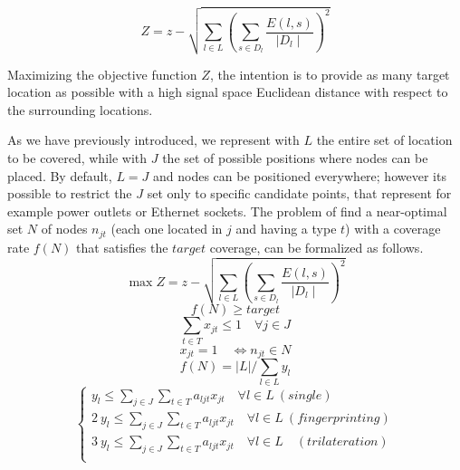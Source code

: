 \begin{equation}\label{eq:Z1}
Z = z - \sqrt{\sum\limits_{l\in L}\left(\sum\limits_{s\in D_l}\frac{E(l,s)}{\mid D_l \mid}\right)^2}
\end{equation}

Maximizing the objective function $Z$, the intention is to provide as many target location as possible with a high signal space Euclidean distance with respect to the surrounding locations.


As we have previously introduced, we represent with \(L\)  the entire set of location to be covered, while with \(J\) the set of possible positions where nodes can be placed. By default, \(L = J\) and nodes can be positioned everywhere; however its possible to restrict the \(J\) set only to specific candidate points, that represent for example power outlets or Ethernet sockets.
The problem of find a near-optimal set \(N\) of nodes \(n_{jt}\) (each one located in $j$ and having a type $t$) with a coverage rate $f(N)$ that satisfies the $target$ coverage, can be formalized as follows.
\begin{equation}\label{eq:Z}
\max Z = z - \sqrt{\sum\limits_{l\in L}\left(\sum\limits_{s\in D_l}\frac{E(l,s)}{\mid D_l \mid}\right)^2}
\end{equation}
\begin{equation}\label{eq:cov}
f(N) \geq target
\end{equation}
\begin{equation}\label{eq:one}
\sum\limits_{t \in T} x_{jt} \leq 1 \quad \forall j \in J
\end{equation}
\begin{equation}\label{eq:x}
x_{jt} = 1 \quad \iff n_{jt} \in N
\end{equation}
\begin{equation}\label{eq:f}
f(N)= \lvert L \rvert / \sum\limits_{l \in L} y_l
\end{equation}
\begin{equation}\label{eq:y}
\begin{cases}
y_l \leq \sum\limits_{j \in J}\sum\limits_{t \in T} a_{ljt} x_{jt} \quad \forall l \in L ~ (single)\\
2~y_l \leq \sum\limits_{j \in J}\sum\limits_{t \in T} a_{ljt} x_{jt} \quad \forall l \in L ~ (fingerprinting)\\
3~y_l \leq \sum\limits_{j \in J}\sum\limits_{t \in T} a_{ljt} x_{jt} \quad \forall l \in L \quad (trilateration)\\
\end{cases}
\end{equation}

